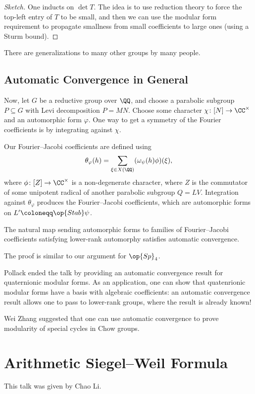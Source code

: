 \documentclass{article}
\begin{document}
\begin{proof}[Sketch]
	One inducts on $\det T$. The idea is to use reduction theory to force the top-left entry of $T$ to be small, and then we can use the modular form requirement to propagate smallness from small coefficients to large ones (using a Sturm bound).
\end{proof}
\begin{remark}
	There are generalizations to many other groups by many people.
\end{remark}

\subsection{Automatic Convergence in General}
Now, let $G$ be a reductive group over $\QQ$, and choose a parabolic subgroup $P\subseteq G$ with Levi decomposition $P=MN$. Choose some character $\chi\colon[N]\to\CC^\times$ and an automorphic form $\varphi$. One way to get a symmetry of the Fourier coefficients is by integrating against $\chi$.

Our Fourier--Jacobi coefficients are defined using
\[\theta_\varphi(h)=\sum_{\xi\in X(\QQ)}(\omega_\psi(h)\phi)(\xi),\]
where $\phi\colon[Z]\to\CC^\times$ is a non-degenerate character, where $Z$ is the commutator of some unipotent radical of another parabolic subgroup $Q=LV$. Integration against $\theta_\varphi$ produces the Fourier--Jacobi coefficients, which are automorphic forms on $L'\coloneqq\op{Stab}\psi$.
\begin{theorem}
	The natural map sending automorphic forms to families of Fourier--Jacobi coefficients satisfying lower-rank automorphy satisfies automatic convergence.
\end{theorem}
The proof is similar to our argument for $\op{Sp}_4$.
\begin{remark}
	Pollack ended the talk by providing an automatic convergence result for quaternionic modular forms. As an application, one can show that quatenrionic modular forms have a basis with algebraic coefficients: an automatic convergence result allows one to pass to lower-rank groups, where the result is already known!
\end{remark}
\begin{idea}
	Wei Zhang suggested that one can use automatic convergence to prove modularity of special cycles in Chow groups.
\end{idea}

\section{Arithmetic Siegel--Weil Formula}
This talk was given by Chao Li.
\end{document}
